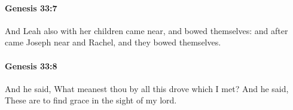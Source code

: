 		\paragraph{Genesis 33:7} %
			\label{GENESIS-33-7}

			And Leah also with her children came near, and bowed themselves: and after came Joseph near and Rachel, and they bowed themselves.


		\paragraph{Genesis 33:8} %
			\label{GENESIS-33-8}

			And he said, What meanest thou by all this drove which I met? And he said, These are to find grace in the sight of my lord.


